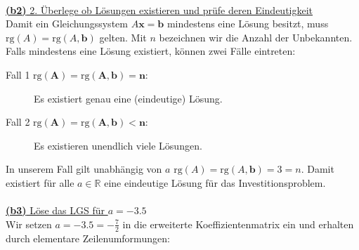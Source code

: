 \ \\
\underline{\textbf{(b2)} 2. Überlege ob Lösungen existieren und prüfe deren Eindeutigkeit}\\
Damit ein Gleichungssystem $ A \mathbf{x} = \mathbf{b} $ mindestens eine Lösung besitzt, muss $ \mathrm{rg}(A) = \mathrm{rg}( A,\mathbf{b} ) $ gelten.
Mit $n$ bezeichnen wir die Anzahl der Unbekannten.
Falls mindestens eine Lösung existiert, können zwei Fälle eintreten:
\begin{description}
	\item[Fall 1 $\mathbf{\mathrm{rg}(A) = \mathrm{rg}(A,b) = n}$:] Es existiert genau eine (eindeutige) Lösung.
	\item[Fall 2 $\mathbf{\mathrm{rg}(A) = \mathrm{rg}(A,b) < n }$:] Es existieren unendlich viele Lösungen.
\end{description}
In unserem Fall gilt unabhängig von $a$ $\mathrm{rg}(A) = \mathrm{rg}(A,\mathbf{b}) = 3 = n$. Damit existiert für alle $a \in \mathbb{R}$ eine eindeutige Lösung für das Investitionsproblem.\\
\\
\underline{\textbf{(b3)} Löse das LGS für $a=-3.5 $}\\
Wir setzen $a = -3.5 = - \frac{7	}{2}$ in die erweiterte Koeffizientenmatrix ein und erhalten durch elementare Zeilenumformungen:
